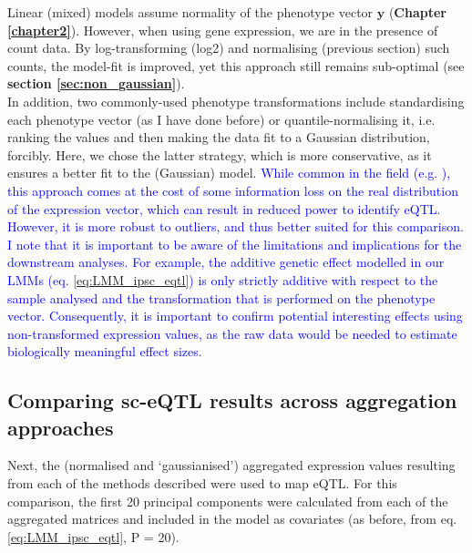Linear (mixed) models assume normality of the phenotype vector $\mathbf{y}$ (\textbf{Chapter \ref{chapter2}}).
However, when using gene expression, we are in the presence of count data.
By log-transforming (log2) and normalising (previous section) such counts, the model-fit is improved, yet this approach still remains sub-optimal (see \textbf{section \ref{sec:non_gaussian}}). \\

In addition, two commonly-used phenotype transformations include standardising each phenotype vector (as I have done before) or quantile-normalising it, i.e. ranking the values and then making the data fit to a Gaussian distribution, forcibly.
Here, we chose the latter strategy, which is more conservative, as it ensures a better fit to the (Gaussian) model.
\textcolor{blue}{While common in the field (e.g. \cite{aguet2019gtex, kerimov2020eqtl}), this approach comes at the cost of some information loss on the real distribution of the expression vector, which can result in reduced power to identify eQTL.
However, it is more robust to outliers, and thus better suited for this comparison.
I note that it is important to be aware of the limitations and implications for the downstream analyses. 
For example, the additive genetic effect modelled in our LMMs (eq. \eqref{eq:LMM_ipsc_eqtl}) is only strictly additive with respect to the sample analysed and the transformation that is performed on the phenotype vector. 
Consequently, it is important to confirm potential interesting effects using non-transformed expression values, as the raw data would be needed to estimate biologically meaningful effect sizes. }

\newpage

\subsection{Comparing sc-eQTL results across aggregation approaches}

Next, the (normalised and `gaussianised') aggregated expression values resulting from each of the methods described were used to map eQTL.
For this comparison, the first 20 principal components were calculated from each of the aggregated matrices and included in the model as covariates (as before, from eq. \eqref{eq:LMM_ipsc_eqtl}, P = 20).
\\

